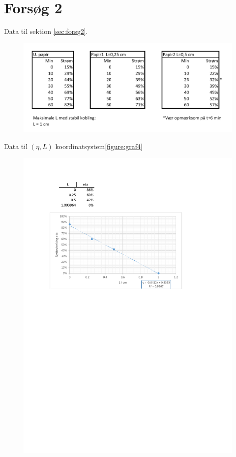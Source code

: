 \chapter{Forsøg 2} \label{bilag:forsg2}

Data til sektion \vref{sec:forsg2}.
\begin{figure}[H]
\centering
\includegraphics[width=1\textwidth]{Setup/forsg_2_bilag2}
\label{figure:forsg2}
\end{figure}
Data til $(\eta ,L)$ koordinatsystem\vref{figure:graf4}
\begin{figure}[H]
\includegraphics[scale=1]{Setup/forsg2_bilag3}
\label{figure:forsg2}
\end{figure}
